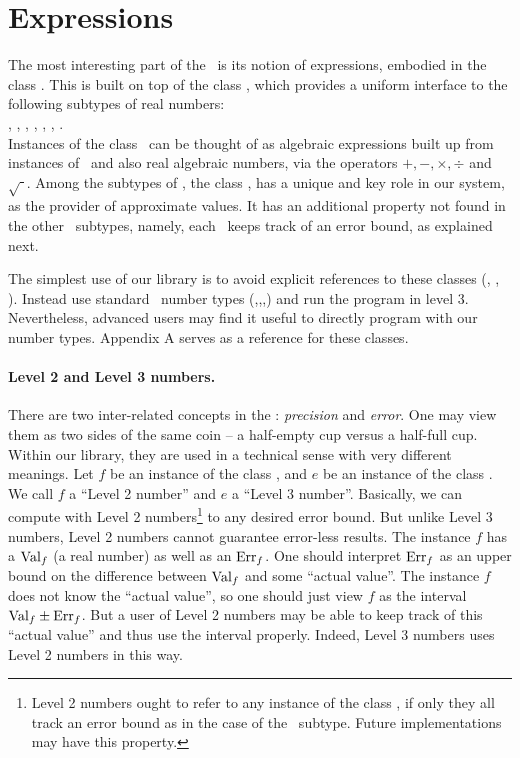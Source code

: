 \documentclass[12pt]{article}
\begin{document}
\section{Expressions}

The most interesting part of the \corelib\ is its
notion of expressions, embodied in the class \expr.
This is built on top of the class
\real, which provides a uniform
interface to the following subtypes of real numbers:
\\
\hspace*{1in} \int, \lng, \float, \double, \Int, \Rat, \BF.  
\\
Instances of the class \expr\ can be thought of as
algebraic expressions built up from instances of \real\
and also real algebraic numbers, via the operators
$ +, -, \times, \div$ and $\sqrt{\phantom{\cdot}}$.
Among the subtypes of \real, the
class \BF, has a unique and key role in our system,
as the provider of approximate values.
It has an additional property not found
in the other \real\ subtypes, namely, each \BF\ keeps
track of an error bound, as explained next.

The simplest use of our library is to avoid 
explicit references to these classes (\expr, \real, \BF).
Instead use standard \cpp\ number types (\int,\lng,\float,\double)
and run the program in level 3.
Nevertheless, advanced users may find it useful to
directly program with our number types.
Appendix A serves as a reference for these classes.

\paragraph{Level 2 and Level 3 numbers.}
There are two inter-related concepts in
the \corelib: {\em precision} and {\em error}.
One may view them as two sides of the same coin --
a half-empty cup versus a half-full cup.
Within our library, they are used in a technical
sense with very different meanings.
Let $f$ be an instance of the class \BF,
and $e$ be an instance of the class \expr.
We call $f$ a ``Level 2 number'' and $e$ a ``Level 3 number''.  
Basically, we can compute with Level 2 numbers\footnote{
%
Level 2 numbers ought to refer to any
instance of the class \real, if only they all
track an error bound as in the case of the \BF\ subtype.
Future implementations may have this property.
%
} to any desired error bound.  But unlike Level 3 numbers,
Level 2 numbers cannot guarantee error-less results.
The instance $f$ has a  $\mbox{\rm Val}_f$ (a real number)
as well as an \dt{error bound} $\mbox{\rm Err}_f$.
One should interpret $\mbox{\rm Err}_f$ as an upper bound on the difference
between $\mbox{\rm Val}_f$ and some ``actual value''.  The instance $f$ does not
know the ``actual value'', so one should just view $f$ as the
interval $\mbox{\rm Val}_f \pm \mbox{\rm Err}_f$.  But a
user of Level 2 numbers may be able to keep track of this ``actual value''
and thus use the interval properly.  Indeed, Level 3 numbers
uses Level 2 numbers in this way.
\end{document}
